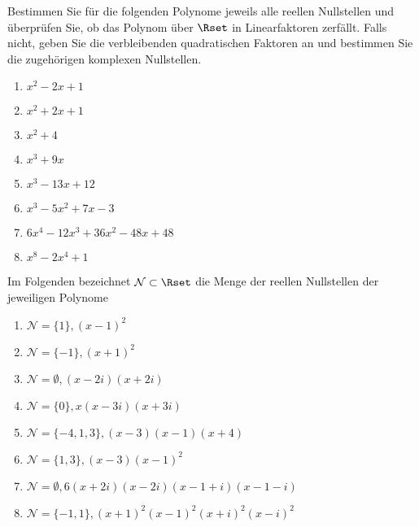 \documentclass[12pt]{exam}
\begin{document}
\begin{questions}
Bestimmen Sie für die folgenden Polynome jeweils alle reellen Nullstellen und überprüfen Sie, ob das Polynom über $\Rset$ in Linearfaktoren zerfällt. Falls nicht, geben Sie die verbleibenden quadratischen Faktoren an und bestimmen Sie die zugehörigen komplexen Nullstellen.\\
\parbox{0.5\textwidth}{\begin{enumerate}
		\item $x^2-2x+1$
		\item $x^2+2x+1$ 
		\item $x^2+4$
		\item $x^3+9x$
\end{enumerate}}\parbox{0.5\textwidth}{\begin{enumerate}\setcounter{enumi}{4}
		\item $x^3-13 x+12$
		\item $x^3-5 x^2+7 x-3$
		\item $6 x^4-12 x^3+36 x^2-48 x+48$ 
		\item $x^8 - 2 x^4 + 1$
\end{enumerate}}
\begin{solution}
	Im Folgenden bezeichnet $\mathcal{N}\subset\Rset$ die Menge der reellen Nullstellen der jeweiligen Polynome
	\begin{enumerate}
		\item $\mathcal{N}=\{1\}, (x-1)^2$
		\item $\mathcal{N}=\{-1\}, (x+1)^2$
		\item $\mathcal{N}=\emptyset, (x-2i)(x+2i)$
		\item $\mathcal{N}=\{0\}, x(x-3i)(x+3i)$
		\item $\mathcal{N}=\{-4, 1, 3\}, (x-3)(x-1)(x+4)$
		\item $\mathcal{N}=\{1, 3\}, (x-3)(x-1)^2$
		\item $\mathcal{N}=\emptyset, 6(x+2i)(x-2i)(x-1+i)(x-1-i)$
		\item $\mathcal{N}=\{-1, 1\}, (x+1)^2(x-1)^2(x+i)^2(x-i)^2$
	\end{enumerate}
\end{solution}

\pagebreak




\end{questions}
\end{document}

